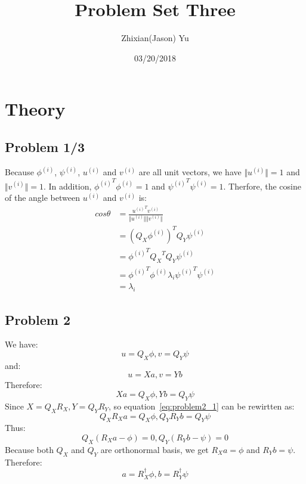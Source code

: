 \documentclass{article}
\title{Problem Set Three}
\date{03/20/2018}
\author{Zhixian(Jason) Yu}
\begin{document}
\maketitle
{}
\newpage

\section{Theory}
\subsection*{Problem 1/3}
Because $\phi^{(i)}$, $\psi^{(i)}$, $u^{(i)}$ and $v^{(i)}$ are all unit vectors, we have $\Vert u^{(i)} \Vert= 1$ and $\Vert v^{(i)} \Vert= 1$. In addition, ${\phi^{(i)}}^T \phi^{(i)} = 1$ and ${\psi^{(i)}}^T \psi^{(i)} = 1$. Therfore, the cosine of the angle between $u^{(i)}$ and $v^{(i)}$ is:
\begin{align*}
cos\theta &= \frac{{u^{(i)}}^T v^{(i)}}{{\Vert u^{(i)} \Vert}{\Vert v^{(i)}} \Vert} \\
&= {(Q_X \phi^{(i)})}^T  Q_Y \psi^{(i)} \\
&= {\phi^{(i)}}^T {Q_X}^T Q_Y \psi^{(i)} \\
&= {\phi^{(i)}}^T \phi^{(i)} \lambda_i {\psi^{(i)}}^T \psi^{(i)} \\
&= \lambda_i
\end{align*}

\subsection*{Problem 2}
We have:
\begin{equation*}
u = Q_X \phi, v = Q_Y \psi
\end{equation*}
and:
\begin{equation*}
u = Xa, v = Yb
\end{equation*}
Therefore:
\begin{equation}
\label{eq:problem2_1}
Xa = Q_X \phi, Yb = Q_Y \psi
\end{equation}
Since $X = Q_X R_X, Y = Q_Y R_Y$, so equation~\ref{eq:problem2_1} can be rewirtten as:
\begin{equation*}
Q_X R_X a = Q_X \phi, Q_Y R_Y b = Q_Y \psi
\end{equation*}
Thus:
\begin{equation*}
Q_X(R_X a - \phi) = 0, Q_Y (R_Y b - \psi)= 0
\end{equation*}
Because both $Q_X$ and $Q_Y$ are orthonormal basis, we get $R_X a = \phi$ and $R_Y b = \psi$. Therefore:
\begin{equation*}
a = R_X^\dag \phi, b = R_Y^\dag \psi
\end{equation*}
\end{document}
